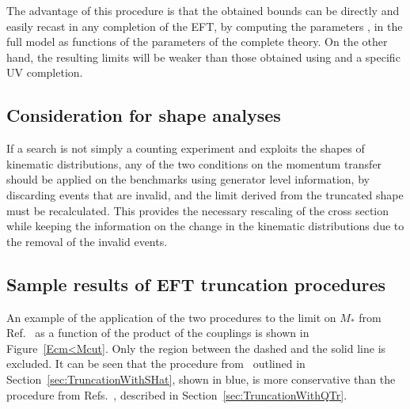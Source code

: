 The advantage of this procedure is that the obtained bounds can be directly and easily recast in any  completion of the EFT, by computing the parameters \Mstar, \Mcut in the full model as functions of the parameters of the complete theory. On the other hand, the resulting limits will be weaker than those obtained using \Qtr and a specific UV completion.

\subsection{Consideration for shape analyses}

If a search is not simply a counting experiment and exploits the shapes of kinematic distributions, any of the two conditions on the momentum transfer should be applied on the benchmarks using generator level information, by discarding events that are invalid, and the limit derived from
the truncated shape must be recalculated. This provides the necessary rescaling of the cross section while keeping the information on the change in the kinematic distributions due to the removal of the invalid events. 

\subsection{Sample results of EFT truncation procedures}

An example of the application of the two procedures to the limit on $M_*$ from Ref.~\cite{ATL-PHYS-PUB-2014-007} as a function of the product of the couplings is shown in Figure~\ref{Ecm<Mcut}. Only the region between the dashed and the solid line is excluded. It can be seen that the procedure from~\cite{Racco:2015dxa} outlined in Section~\ref{sec:TruncationWithSHat}, shown in blue, is more conservative than the procedure from Refs.~\cite{Busoni:2014sya,Aad:2015zva}, described in Section~\ref{sec:TruncationWithQTr}.


